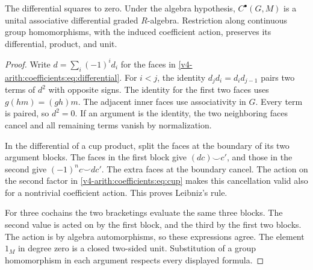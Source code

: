 \begin{proposition}\label{v4-arith:coefficients:prop:cochains}
The differential squares to zero. Under the algebra hypothesis,
\(C^\bullet(G,M)\) is a unital associative differential graded
\(R\)-algebra. Restriction along continuous group homomorphisms,
with the induced coefficient action, preserves its differential,
product, and unit.
\end{proposition}
\begin{proof}
Write \(d=\sum_i(-1)^i d_i\) for the faces in
\eqref{v4-arith:coefficients:eq:differential}. For \(i<j\), the
identity \(d_jd_i=d_id_{j-1}\) pairs two terms of \(d^2\) with
opposite signs. The identity for the first two faces uses
\(g(hm)=(gh)m\). The adjacent inner faces use associativity in
\(G\). Every term is paired, so \(d^2=0\). If an argument is the
identity, the two neighboring faces cancel and all remaining terms
vanish by normalization.

In the differential of a cup product, split the faces at the boundary
of its two argument blocks. The faces in the first block give
\((dc)\smile c'\), and those in the second give
\((-1)^n c\smile dc'\). The extra faces at the boundary cancel.
The action on the second factor in
\eqref{v4-arith:coefficients:eq:cup} makes this cancellation valid
also for a nontrivial coefficient action. This proves Leibniz's rule.

For three cochains the two bracketings evaluate the same three blocks.
The second value is acted on by the first block, and the third by
the first two blocks. The action is by algebra
automorphisms, so these expressions agree. The element \(1_M\) in
degree zero is a closed two-sided unit. Substitution of a group
homomorphism in each argument respects every displayed formula.
\end{proof}

